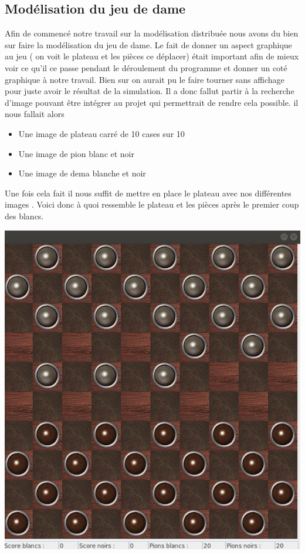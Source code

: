 \documentclass[11pt]{article} %
\begin{document}
\subsection{Modélisation du jeu de dame}
Afin de commencé notre travail sur la modélisation distribuée nous avons du bien sur faire la modélisation du jeu de dame. Le fait de donner un aspect graphique au jeu ( on voit le plateau et les pièces ce déplacer) était important afin de mieux voir ce qu'il ce passe pendant le déroulement du programme et donner un coté graphique à notre travail. Bien sur on aurait pu le faire tourner sans affichage pour juste avoir le résultat de la simulation. Il a donc fallut partir à la recherche d'image pouvant être intégrer au projet qui permettrait de rendre cela possible. il nous fallait alors
\begin{itemize}
\item Une image de plateau carré de 10 cases sur 10
\item Une image de pion blanc et noir
\item Une image de dema blanche et noir
\end{itemize}
Une fois cela fait il nous suffit de mettre en place le plateau avec nos différentes images \cite{annexe1}. Voici donc à quoi ressemble le plateau et les pièces après le premier coup des blancs.

\begin{center}
\includegraphics[scale=0.4]{plateau_ini}
\end{center}
\end{document}

